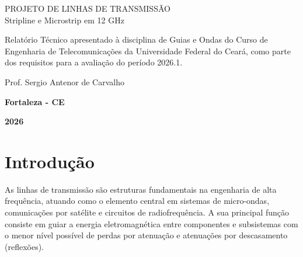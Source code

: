 \documentclass[12pt,a4paper]{report}
\begin{document}
\begin{titlepage}

\vspace*{4cm}

\begin{center}
\Large
PROJETO DE LINHAS DE TRANSMISSÃO \\[0.2cm]
\small
Stripline e Microstrip em 12 GHz \\[0.2cm]
\end{center}

\vfill

\hspace{8cm}
\begin{minipage}{6cm}
\small
Relatório Técnico apresentado à disciplina de
Guias e Ondas do Curso de Engenharia de
Telecomunicações da Universidade Federal do
Ceará, como parte dos requisitos para a
avaliação do período 2026.1.

\vspace{1cm}

Prof. Sergio Antenor de Carvalho
\end{minipage}

\vfill

\begin{center}
\textbf{Fortaleza - CE}

\vspace{0.2cm}

\textbf{2026}
\end{center}

\end{titlepage}


\tableofcontents
\newpage


\chapter{Introdução}

As linhas de transmissão são estruturas fundamentais na engenharia de alta frequência, atuando como o elemento central em sistemas de micro-ondas, comunicações por satélite e circuitos de radiofrequência. A sua principal função consiste em guiar a energia eletromagnética entre componentes e subsistemas com o menor nível possível de perdas por atenuação e atenuações por descasamento (reflexões). 
\end{document}

